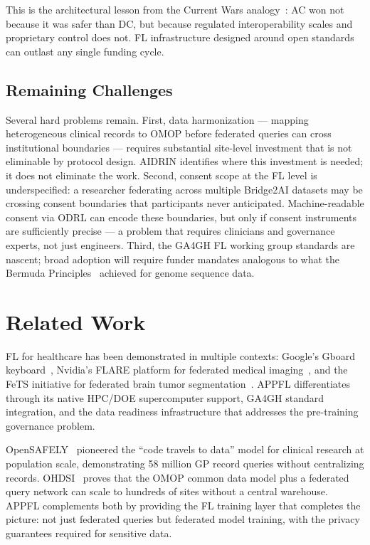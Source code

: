 \documentclass[conference]{IEEEtran}
\begin{document}
This is the architectural lesson from the Current Wars analogy~\cite{varma2026current}: AC won not because it was safer than DC, but because regulated interoperability scales and proprietary control does not. FL infrastructure designed around open standards can outlast any single funding cycle.

\subsection{Remaining Challenges}

Several hard problems remain. First, data harmonization — mapping heterogeneous clinical records to OMOP before federated queries can cross institutional boundaries — requires substantial site-level investment that is not eliminable by protocol design. AIDRIN identifies where this investment is needed; it does not eliminate the work. Second, consent scope at the FL level is underspecified: a researcher federating across multiple Bridge2AI datasets may be crossing consent boundaries that participants never anticipated. Machine-readable consent via ODRL can encode these boundaries, but only if consent instruments are sufficiently precise — a problem that requires clinicians and governance experts, not just engineers. Third, the GA4GH FL working group standards are nascent; broad adoption will require funder mandates analogous to what the Bermuda Principles~\cite{bermuda1996} achieved for genome sequence data.

\section{Related Work}

FL for healthcare has been demonstrated in multiple contexts: Google's Gboard keyboard~\cite{mcmahan2017}, Nvidia's FLARE platform for federated medical imaging~\cite{roth2022}, and the FeTS initiative for federated brain tumor segmentation~\cite{pati2022}. APPFL differentiates through its native HPC/DOE supercomputer support, GA4GH standard integration, and the data readiness infrastructure that addresses the pre-training governance problem.

OpenSAFELY~\cite{opensafely2020} pioneered the ``code travels to data'' model for clinical research at population scale, demonstrating 58 million GP record queries without centralizing records. OHDSI~\cite{ohdsi} proves that the OMOP common data model plus a federated query network can scale to hundreds of sites without a central warehouse. APPFL complements both by providing the FL training layer that completes the picture: not just federated queries but federated model training, with the privacy guarantees required for sensitive data.
\end{document}

